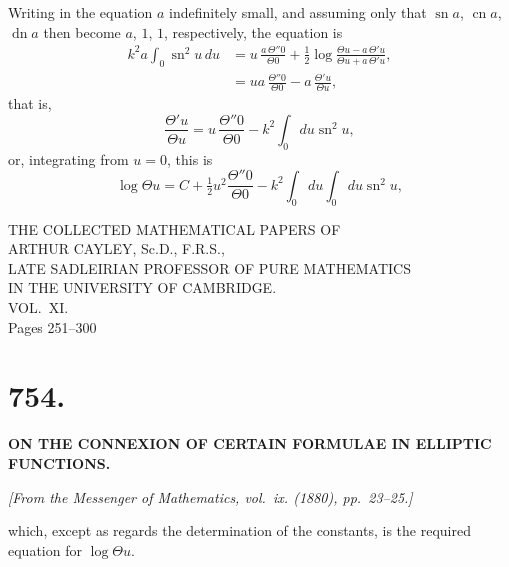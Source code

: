 \documentclass[11pt,a4paper]{book}
\begin{document}
Writing in the equation $a$ indefinitely small, and assuming only that $\operatorname{sn} a$, $\operatorname{cn} a$, $\operatorname{dn} a$ then become $a$, $1$, $1$, respectively, the equation is
\begin{align*}
k^2 a \int_0 \operatorname{sn}^2 u\, du &= u\, \frac{a\, \Theta''0}{\Theta 0} + \tfrac{1}{2}\log \frac{\Theta u - a\, \Theta' u}{\Theta u + a\, \Theta' u}, \\
&= ua\, \frac{\Theta''0}{\Theta 0} - a\, \frac{\Theta' u}{\Theta u},
\end{align*}
that is,
\[
\frac{\Theta' u}{\Theta u} = u\, \frac{\Theta''0}{\Theta 0} - k^2 \int_0 du \operatorname{sn}^2 u,
\]
or, integrating from $u = 0$, this is
\[
\log \Theta u = C + \tfrac{1}{2}u^2 \frac{\Theta''0}{\Theta 0} - k^2 \int_0 du \int_0 du \operatorname{sn}^2 u,
\]
\clearpage


\begin{center}
{\Large THE COLLECTED MATHEMATICAL PAPERS OF}\\[6pt]
{\LARGE ARTHUR CAYLEY, Sc.D., F.R.S.,}\\[3pt]
{\large LATE SADLEIRIAN PROFESSOR OF PURE MATHEMATICS}\\
{\large IN THE UNIVERSITY OF CAMBRIDGE.}\\[12pt]
{\Large VOL.~XI.}\\[24pt]
{\large Pages 251--300}
\end{center}

\newpage


\section*{754.}

\begin{center}
\textbf{ON THE CONNEXION OF CERTAIN FORMULAE IN ELLIPTIC FUNCTIONS.}
\end{center}

\begin{flushright}
\textit{[From the Messenger of Mathematics, vol.~ix. (1880), pp.~23--25.]}
\end{flushright}

\noindent
which, except as regards the determination of the constants, is the required equation
for $\log \Theta u$.
\end{document}
